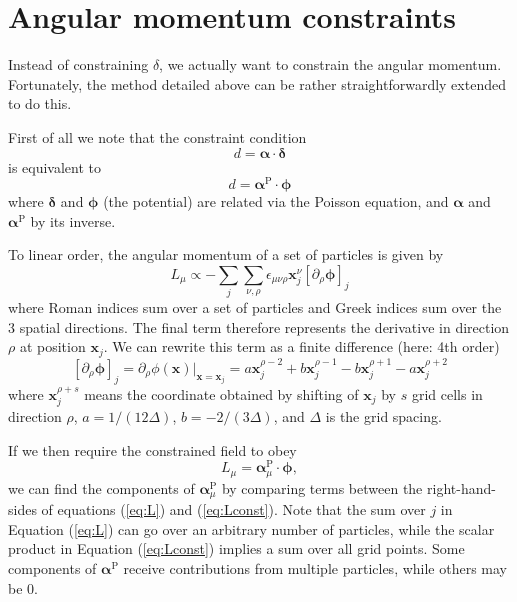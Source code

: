 \documentclass[11pt,a4paper,preprint]{aastex}
\newcommand{\bmath}[1]{\ensuremath{\bm{#1}}}
\renewcommand{\vec}[1]{\bmath{#1}}
\begin{document}
\section{Angular momentum constraints}
\label{sec:AM}

Instead of constraining $\delta$, we actually want to constrain the angular momentum. Fortunately, the method detailed above can be rather straightforwardly extended to do this. 

First of all we note that the constraint condition
\begin{equation}
d= \vec{\alpha} \cdot \vec{\delta}
\end{equation}
is equivalent to 
\begin{equation}
d= \vec{\alpha}^{\mathrm{P}} \cdot \vec{\phi}
\end{equation}
where $\vec{\delta}$ and $\vec{\phi}$ (the potential) are related via the Poisson equation, and $\vec{\alpha}$ and $\vec{\alpha}^{\mathrm{P}}$ by its inverse.

To linear order, the angular momentum of a set of particles is given by
\begin{equation}
L_{\mu} \propto - \sum_j \sum_{\nu, \rho} \epsilon_{\mu \nu \rho} \vec{x}_j^{\nu} \left[ \partial_{\rho} \vec{\phi} \right] _j
\label{eq:L}
\end{equation}
where Roman indices sum over a set of particles and Greek indices sum over the 3 spatial directions. The final term therefore represents the derivative in direction $\rho$ at position $\vec{x}_j$. We can rewrite this term as a finite difference (here: 4th order)
\begin{equation}
\left[ \partial_{\rho} \vec{\phi} \right] _j =  \partial_{\rho} \phi(\vec{x})|_{\vec{x}=\vec{x}_j} = a \vec{x}_j^{\rho-2} +b\vec{x}_j^{\rho-1} -b \vec{x}_j^{\rho+1} -a \vec{x}_j^{\rho+2}
\end{equation}
where $\vec{x}_j^{\rho+s}$ means the coordinate obtained by shifting of $\vec{x}_j$ by $s$ grid cells in direction $\rho$, $a=1/(12 \Delta) $, $b=-2/(3 \Delta)$, and $\Delta$ is the grid spacing.

If we then require the constrained field to obey
\begin{equation}
L_{\mu} = \vec{\alpha}_{\mu}^{\mathrm{P}} \cdot \vec{\phi},
\label{eq:Lconst}
\end{equation}
we can find the components of $\vec{\alpha}_{\mu}^{\mathrm{P}}$ by comparing terms between the right-hand-sides of equations (\ref{eq:L}) and (\ref{eq:Lconst}). Note that the sum over $j$ in Equation (\ref{eq:L}) can go over an arbitrary number of particles, while the scalar product in Equation (\ref{eq:Lconst}) implies a sum over all grid points. Some components of $\vec{\alpha}^{\mathrm{P}}$ receive contributions from multiple particles, while others may be 0.
\end{document}
